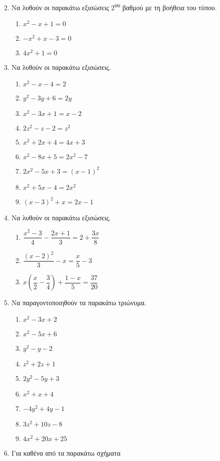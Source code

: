 \documentclass[twoside,nofonts,internet]{askhseis}
\begin{document}
\begin{enumerate}
\begin{multicols}{3}
\end{multicols}
\item Να λυθούν οι παρακάτω εξισώσεις 2\textsuperscript{ου} βαθμού με τη βοήθεια του τύπου.
\begin{multicols}{3}
\begin{enumerate}[label=\roman*.]
\item $ x^2-x+1=0 $
\item $ -x^2+x-3=0 $
\item $ 4x^2+1=0 $
\end{enumerate}
\end{multicols}
\item Να λυθούν οι παρακάτω εξισώσεις.
\begin{multicols}{3}
\begin{enumerate}[label=\roman*.]
\item $ x^2-x-4=2 $
\item $ y^2-3y+6=2y $
\item $ x^2-3x+1=x-2 $
\item $ 2z^2-z-2=z^2 $
\item $ x^2+2x+4=4x+3 $
\item $ x^2-8x+5=2x^2-7 $
\item $ 2x^2-5x+3=(x-1)^2 $
\item $ x^2+5x-4=2x^2 $
\item $ (x-3)^2+x=2x-1 $
\end{enumerate}
\end{multicols}
\item Να λυθούν οι παρακάτω εξισώσεις.
\begin{multicols}{3}
\begin{enumerate}[label=\roman*.]
\item $ \dfrac{x^2-3}{4}-\dfrac{2x+1}{3}=2+\dfrac{3x}{8} $
\item $ \dfrac{(x-2)^2}{3}-x=\dfrac{x}{5}-3 $
\item $ x\left(\dfrac{x}{2}-\dfrac{3}{4} \right)+\dfrac{1-x}{5}=\dfrac{37}{20}  $
\end{enumerate}
\end{multicols}
\item Να παραγοντοποιηθούν τα παρακάτω τριώνυμα.
\begin{multicols}{3}
\begin{enumerate}[label=\roman*.]
\item $ x^2-3x+2 $
\item $ x^2-5x+6 $
\item $ y^2-y-2 $
\item $ z^2+2z+1 $
\item $ 2y^2-5y+3 $
\item $ x^2+x+4 $
\item $ -4y^2+4y-1 $
\item $ 3z^2+10z-8 $
\item $ 4x^2+20x+25 $
\end{enumerate}
\end{multicols}
\item Για καθένα από τα παρακάτω σχήματα 
\end{enumerate}
\end{document}
